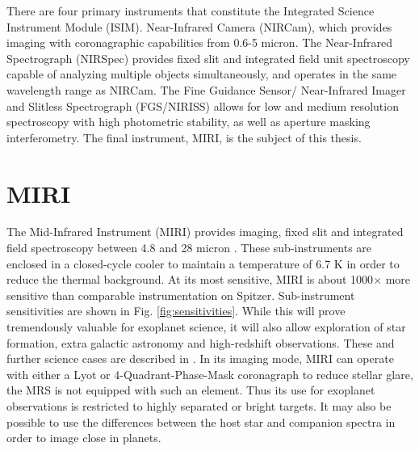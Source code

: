 There are four primary instruments that constitute the Integrated Science Instrument Module (ISIM). 
Near-Infrared Camera (NIRCam), which provides imaging with coronagraphic capabilities from 0.6-5 micron.
The Near-Infrared Spectrograph (NIRSpec) provides fixed slit and integrated field unit spectroscopy capable of analyzing multiple objects simultaneously, and operates in the same wavelength range as NIRCam.
The Fine Guidance Sensor/ Near-Infrared Imager and Slitless Spectrograph (FGS/NIRISS) allows for low and medium resolution spectroscopy with high photometric stability, as well as aperture masking interferometry. 
The final instrument, MIRI, is the subject of this thesis.

\section{MIRI}
The Mid-Infrared Instrument (MIRI) provides imaging, fixed slit and integrated field spectroscopy between 4.8 and 28 micron \parencite{MIRI2}.
These sub-instruments are enclosed in a closed-cycle cooler to maintain a temperature of 6.7 K in order to reduce the thermal background.
At its most sensitive, MIRI is about 1000$\times$ more sensitive than comparable instrumentation on Spitzer. 
Sub-instrument sensitivities are shown in Fig. \ref{fig:sensitivities}.
While this will prove tremendously valuable for exoplanet science, it will also allow exploration of star formation, extra galactic astronomy and high-redshift observations. 
These and further science cases are described in \parencite{MIRI1}. 
In its imaging mode, MIRI can operate with either a Lyot or 4-Quadrant-Phase-Mask coronagraph to reduce stellar glare, the MRS is not equipped with such an element. 
Thus its use for exoplanet observations is restricted to highly separated or bright targets. 
It may also be possible to use the differences between the host star and companion spectra in order to image close in planets.


